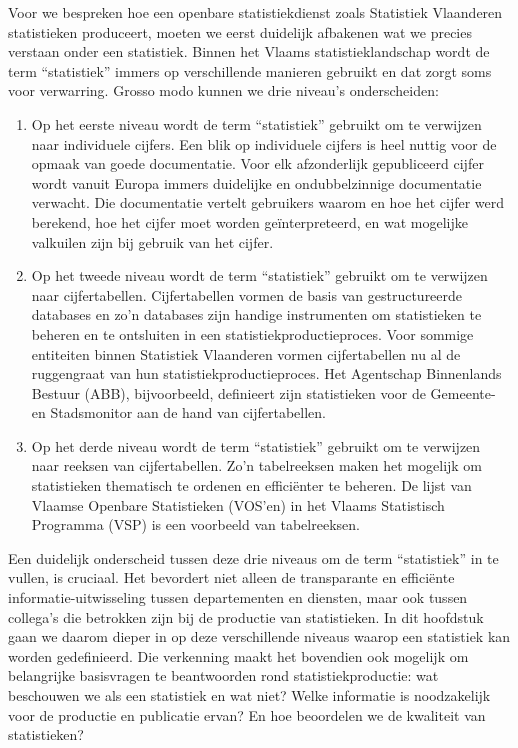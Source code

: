 \documentclass[\mainfiledir/00_handleiding_statistiekproductie.tex]{subfiles}
\begin{document}
	
Voor we bespreken hoe een openbare statistiekdienst zoals Statistiek Vlaanderen statistieken produceert, moeten we eerst duidelijk afbakenen wat we precies verstaan onder een statistiek. Binnen het Vlaams statistieklandschap wordt de term ``statistiek'' immers op verschillende manieren gebruikt en dat zorgt soms voor verwarring. Grosso modo kunnen we drie niveau's onderscheiden:
\begin{enumerate}
\item Op het eerste niveau wordt de term ``statistiek'' gebruikt om te verwijzen naar individuele cijfers. Een blik op individuele cijfers is heel nuttig voor de opmaak van goede documentatie. Voor elk afzonderlijk gepubliceerd cijfer wordt vanuit Europa immers duidelijke en ondubbelzinnige documentatie verwacht. Die documentatie vertelt gebruikers waarom en hoe het cijfer werd berekend, hoe het cijfer moet worden geïnterpreteerd, en wat mogelijke valkuilen zijn bij gebruik van het cijfer. 
\item Op het tweede niveau wordt de term ``statistiek'' gebruikt om te verwijzen naar cijfertabellen. Cijfertabellen vormen de basis van gestructureerde databases en zo'n databases zijn handige instrumenten om statistieken te beheren en te ontsluiten in een statistiekproductieproces. Voor sommige entiteiten binnen Statistiek Vlaanderen vormen cijfertabellen nu al de ruggengraat van hun statistiekproductieproces. Het Agentschap Binnenlands Bestuur (ABB), bijvoorbeeld, definieert zijn statistieken voor de Gemeente- en Stadsmonitor aan de hand van cijfertabellen.
\item Op het derde niveau wordt de term ``statistiek'' gebruikt om te verwijzen naar reeksen van cijfertabellen. Zo'n tabelreeksen maken het mogelijk om statistieken thematisch te ordenen en efficiënter te beheren. De lijst van Vlaamse Openbare Statistieken (VOS'en) in het Vlaams Statistisch Programma (VSP) is een voorbeeld van tabelreeksen.
\end{enumerate}
Een duidelijk onderscheid tussen deze drie niveaus om de term ``statistiek'' in te vullen, is cruciaal. Het bevordert niet alleen de transparante en efficiënte informatie-uitwisseling tussen departementen en diensten, maar ook tussen collega’s die betrokken zijn bij de productie van statistieken. In dit hoofdstuk gaan we daarom dieper in op deze verschillende niveaus waarop een statistiek kan worden gedefinieerd. Die verkenning maakt het bovendien ook mogelijk om belangrijke basisvragen te beantwoorden rond statistiekproductie: wat beschouwen we als een statistiek en wat niet? Welke informatie is noodzakelijk voor de productie en publicatie ervan? En hoe beoordelen we de kwaliteit van statistieken?
	
\end{document}
